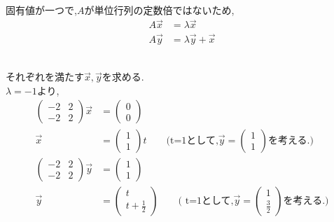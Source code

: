 \documentclass{jsarticle}
\begin{document}
\leavevmode\\
固有値が一つで,$A$が単位行列の定数倍ではないため,
  \begin{align*}
      A \overrightarrow{x} &= \lambda \overrightarrow{x}\\
      A \overrightarrow{y}  &= \lambda  \overrightarrow{y} + \overrightarrow{x}
  \end{align*}

\leavevmode\\
それぞれを満たす$\overrightarrow{x},\overrightarrow{y}$を求める.
\leavevmode\\
$\lambda = -1$より,
  \begin{align*}
    \begin{pmatrix}-2&2\\-2&2\end{pmatrix} \overrightarrow{x} &= \begin{pmatrix}0\\0\end{pmatrix}\\
    \overrightarrow{x} &= \begin{pmatrix}1\\1\end{pmatrix}t 
    \qquad \text{(t=1として,$\overrightarrow{y}= \begin{pmatrix}1\\1 \end{pmatrix}$を考える.)}\\
    \begin{pmatrix}-2&2\\-2&2\end{pmatrix} \overrightarrow{y} &= \begin{pmatrix}1\\1\end{pmatrix}\\
    \overrightarrow{y} &= \begin{pmatrix}t\\t+ \frac{1}{2} \end{pmatrix} 
    \qquad \text{( t=1として,$\overrightarrow{y}= \begin{pmatrix}1\\\frac{3}{2} \end{pmatrix}$を考える.)}
  \end{align*}
\end{document}
